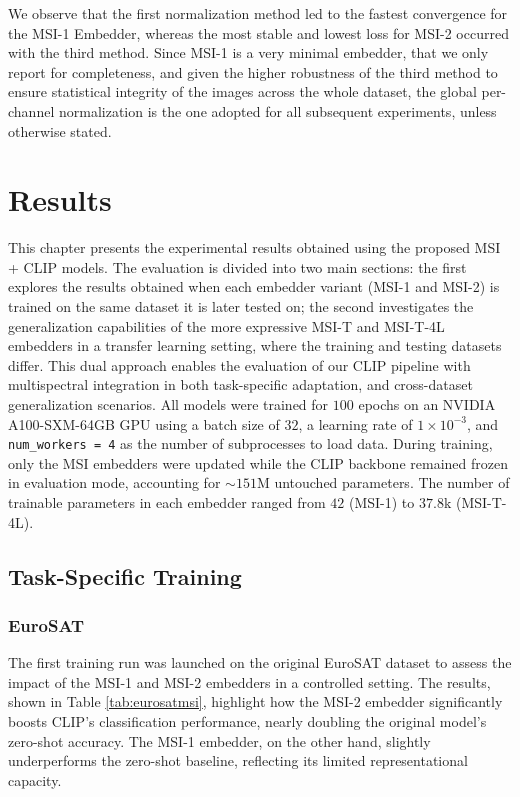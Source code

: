 \documentclass[a4paper, oneside, english]{sapthesis} %
\begin{document}
We observe that the first normalization method led to the fastest convergence for the MSI-1 Embedder, whereas the most stable and lowest loss for MSI-2 occurred with the third method. Since MSI-1 is a very minimal embedder, that we only report for completeness, and given the higher robustness of the third method to ensure statistical integrity of the images across the whole dataset, the global per-channel normalization is the one adopted for all subsequent experiments, unless otherwise stated.


\chapter{Results}\label{Results} %

This chapter presents the experimental results obtained using the proposed MSI + CLIP models. The evaluation is divided into two main sections: the first explores the results obtained when each embedder variant (MSI-1 and MSI-2) is trained on the same dataset it is later tested on; the second investigates the generalization capabilities of the more expressive MSI-T and MSI-T-4L embedders in a transfer learning setting, where the training and testing datasets differ. This dual approach enables the evaluation of our CLIP pipeline with multispectral integration in both task-specific adaptation, and cross-dataset generalization scenarios.
All models were trained for $100$ epochs on an NVIDIA A100-SXM-64GB GPU using a batch size of 
$32$, a learning rate of $1\times10^{-3}$, and \texttt{num\_workers = 4} as the number of subprocesses to load data. During training, only the MSI embedders were updated while the CLIP backbone remained frozen in evaluation mode, accounting for $\sim 151$M untouched parameters. The number of trainable parameters in each embedder ranged from $42$ (MSI-1) to $37.8$k (MSI-T-4L).



\section{Task-Specific Training}\label{sec:training}

\subsection{EuroSAT}

The first training run was launched on the original EuroSAT dataset to assess the impact of the MSI-1 and MSI-2 embedders in a controlled setting. The results, shown in Table \ref{tab:eurosatmsi}, highlight how the MSI-2 embedder significantly boosts CLIP's classification performance, nearly doubling the original model's zero-shot accuracy. The MSI-1 embedder, on the other hand, slightly underperforms the zero-shot baseline, reflecting its limited representational capacity.
\end{document}
